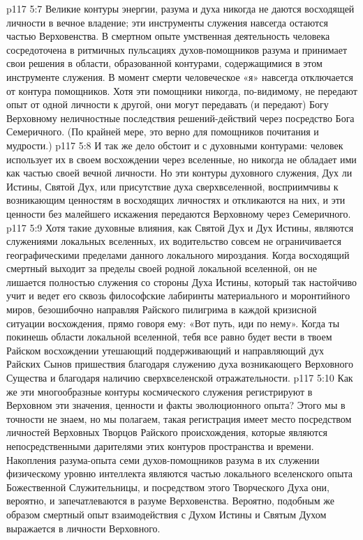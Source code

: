 \vs p117 5:7 Великие контуры энергии, разума и духа никогда не даются восходящей личности в вечное владение; эти инструменты служения навсегда остаются частью Верховенства. В смертном опыте умственная деятельность человека сосредоточена в ритмичных пульсациях духов\hyp{}помощников разума и принимает свои решения в области, образованной контурами, содержащимися в этом инструменте служения. В момент смерти человеческое «я» навсегда отключается от контура помощников. Хотя эти помощники никогда, по\hyp{}видимому, не передают опыт от одной личности к другой, они могут передавать (и передают) Богу Верховному неличностные последствия решений\hyp{}действий через посредство Бога Семеричного. (По крайней мере, это верно для помощников почитания и мудрости.)
\vs p117 5:8 И так же дело обстоит и с духовными контурами: человек использует их в своем восхождении через вселенные, но никогда не обладает ими как частью своей вечной личности. Но эти контуры духовного служения, Дух ли Истины, Святой Дух, или присутствие духа сверхвселенной, восприимчивы к возникающим ценностям в восходящих личностях и откликаются на них, и эти ценности без малейшего искажения передаются Верховному через Семеричного.
\vs p117 5:9 \pc Хотя такие духовные влияния, как Святой Дух и Дух Истины, являются служениями локальных вселенных, их водительство совсем не ограничивается географическими пределами данного локального мироздания. Когда восходящий смертный выходит за пределы своей родной локальной вселенной, он не лишается полностью служения со стороны Духа Истины, который так настойчиво учит и ведет его сквозь философские лабиринты материального и моронтийного миров, безошибочно направляя Райского пилигрима в каждой кризисной ситуации восхождения, прямо говоря ему: «Вот путь, иди по нему». Когда ты покинешь области локальной вселенной, тебя все равно будет вести в твоем Райском восхождении утешающий поддерживающий и направляющий дух Райских Сынов пришествия благодаря служению духа возникающего Верховного Существа и благодаря наличию сверхвселенской отражательности.
\vs p117 5:10 Как же эти многообразные контуры космического служения регистрируют в Верховном эти значения, ценности и факты эволюционного опыта? Этого мы в точности не знаем, но мы полагаем, такая регистрация имеет место посредством личностей Верховных Творцов Райского происхождения, которые являются непосредственными дарителями этих контуров пространства и времени. Накопления разума\hyp{}опыта семи духов\hyp{}помощников разума в их служении физическому уровню интеллекта являются частью локального вселенского опыта Божественной Служительницы, и посредством этого Творческого Духа они, вероятно, и запечатлеваются в разуме Верховенства. Вероятно, подобным же образом смертный опыт взаимодействия с Духом Истины и Святым Духом выражается в личности Верховного.
